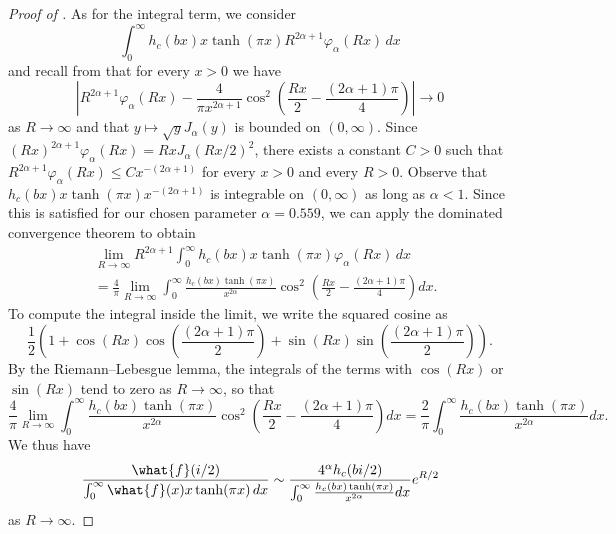 \documentclass[12pt]{amsart}
\numberwithin{equation}{section}
\begin{document}
\begin{proof}[Proof of ]
As for the integral term, we consider
\[
 \int_0^\infty h_c(bx)  x \tanh(\pi x) R^{2\alpha+1} \varphi_\alpha(Rx)\,dx
\]
and recall from  that for every $x>0$ we have
\[
\left| R^{2\alpha+1} \varphi_\alpha(Rx) - \frac{4}{\pi x^{2\alpha+1}} \cos^2 \left( \frac{Rx}{2} - \frac{(2\alpha+1)\pi}{4} \right) \right|  \to 0
\] 
as $R \to \infty$ and that $y \mapsto \sqrt{y} J_\alpha(y)$ is bounded on $(0,\infty)$. Since $(Rx)^{2\alpha+1} \varphi_\alpha(Rx) = Rx J_\alpha(Rx/2)^2$, there exists a constant $C>0$ such that $R^{2\alpha+1} \varphi_\alpha(Rx) \leq  C x^{-(2\alpha+1)}$ for every $x>0$ and every $R>0$. Observe that $h_c(bx)x\tanh(\pi x) x^{-(2\alpha+1)}$  is integrable on $(0,\infty)$ as long as $\alpha<1$. Since this is satisfied for our chosen parameter $\alpha = 0.559$, we can apply the dominated convergence theorem to obtain
\begin{align*}
& \lim_{R \to \infty}  R^{2\alpha+1}\int_0^\infty h_c(bx)  x \tanh(\pi x)  \varphi_\alpha(Rx)\,dx \\
& = \frac{4}{\pi} \lim_{R \to \infty} \int_0^\infty \frac{h_c(bx)\tanh(\pi x)}{x^{2\alpha}} \cos^2 \left( \frac{Rx}{2} - \frac{(2\alpha+1)\pi}{4} \right) dx.
\end{align*}
To compute the integral inside the limit, we write the squared cosine as
\[
\frac12\left( 1+ \cos(Rx)\cos\left(\frac{(2\alpha+1)\pi}{2}\right) +  \sin(Rx)\sin\left(\frac{(2\alpha+1)\pi}{2}\right)  \right).
\]
By the Riemann--Lebesgue lemma, the integrals of the terms with $\cos(Rx)$ or $\sin(Rx)$ tend to zero as $R \to \infty$, so that
\[
\frac{4}{\pi} \lim_{R \to \infty} \int_0^\infty \frac{h_c(bx)\tanh(\pi x)}{x^{2\alpha}} \cos^2 \left( \frac{Rx}{2} - \frac{(2\alpha+1)\pi}{4} \right) dx = \frac{2}{\pi} \int_0^\infty \frac{h_c(bx) \tanh(\pi x)}{x^{2\alpha}}dx.
\]
We thus have
\[
\frac{\what{f}(i/2)}{\int_0^\infty \what{f}(x) x \tanh(\pi x) \,dx} \sim \frac{ 4^{\alpha} h_c(bi/2)}{\int_0^\infty \frac{h_c(bx) \tanh(\pi x)}{x^{2\alpha}}dx} e^{R/2}
\]
as $R \to \infty$.


\end{proof}
\end{document}
